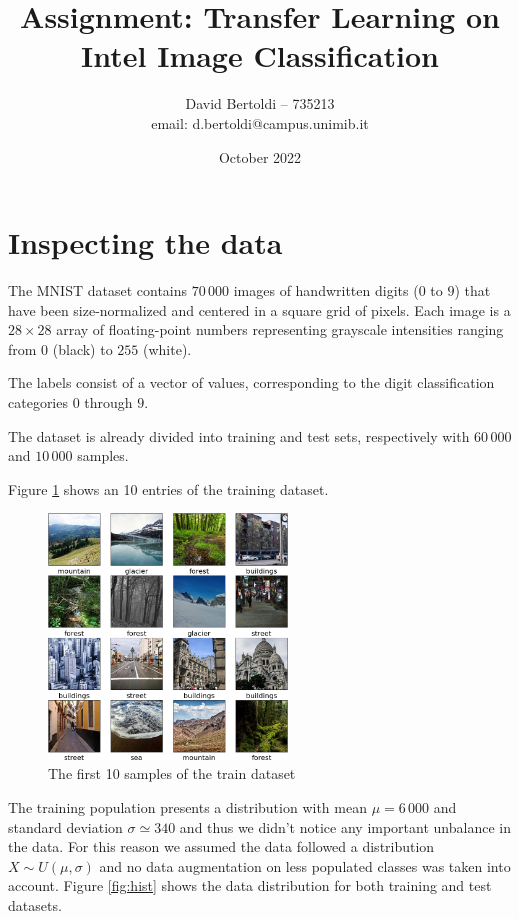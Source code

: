 \documentclass[compsoc]{IEEEtran}
\title{Assignment: Transfer Learning on Intel Image Classification}
\author{David Bertoldi -- 735213 \\ email: d.bertoldi@campus.unimib.it}
\affil{Department of Informatics, Systems and Communication}
\affil{University of Milano-Bicocca}
\date{October 2022}
\begin{document}
\maketitle 



\section{Inspecting the data}\label{sec:insp}
The MNIST dataset contains $70\,000$ images of handwritten digits ($0$ to $9$) that have been size-normalized and centered in a square grid of pixels. Each image is a $28 \times 28$ array of floating-point numbers representing grayscale intensities ranging from $0$ (black) to $255$ (white). \par
The labels consist of a vector of values, corresponding to the digit classification categories $0$ through $9$. \par
The dataset is already divided into training and test sets, respectively with $60\,000$ and $10\,000$ samples. \par

Figure \ref{fig:data} shows an 10 entries of the training dataset.

\begin{figure}[ht!]
\centering                                                                        
\includegraphics[width=2.5in]{../images/samples.png}
\captionsetup{justification=centering}                                                                                         
\caption{The first 10 samples of the train dataset}
\label{fig:data}                                                                                                                               
\end{figure}




The training population presents a distribution with mean $\mu = 6\,000$ and standard deviation $\sigma \simeq 340$ and thus we didn't notice any important unbalance in the data. For this reason we assumed the data followed a distribution $X \sim U(\mu, \sigma)$ and no data augmentation on less populated classes was taken into account. Figure \ref{fig:hist} shows the data distribution for both training and test datasets.
\end{document}
